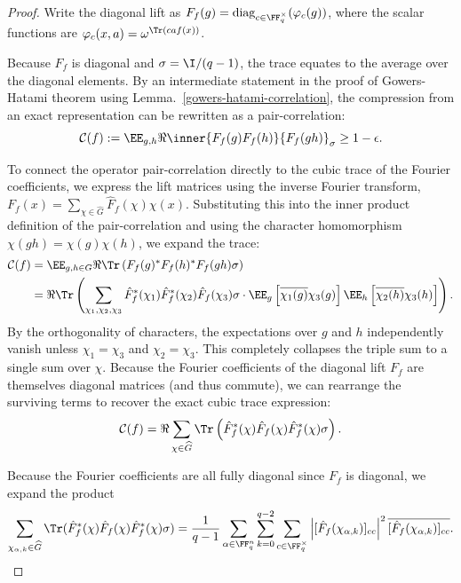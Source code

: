 \begin{proof}\leanok
Write the diagonal lift as $F_f(g) = \operatorname{diag}_{c \in \FF_q^\times}(\varphi_c(g))$, where the scalar functions are $\varphi_c(x,a) = \omega^{\Tr(caf(x))}$. 

Because $F_f$ is diagonal and $\sigma = \I/(q-1)$, the trace equates to the average over the diagonal elements. 
By an intermediate statement in the proof of Gowers-Hatami theorem using Lemma.~\ref{gowers-hatami-correlation}, the compression from an exact representation can be rewritten as a pair-correlation:
\begin{equation}
    \mathcal{C}(f) := \EE_{g,h} \Re \inner{F_f(g) F_f(h)}{F_f(gh)}_\sigma \ge 1 - \epsilon. \label{eq:gh-pair-correlation}
\end{equation}


To connect the operator pair-correlation directly to the cubic trace of the Fourier coefficients, we express the lift matrices using the inverse Fourier transform, $F_f(x) = \sum_{\chi \in \widehat{G}} \hat{F}_f(\chi) \chi(x)$. Substituting this into the inner product definition of the pair-correlation and using the character homomorphism $\chi(gh) = \chi(g)\chi(h)$, we expand the trace:
\begin{align}
    \mathcal{C}(f) &= \EE_{g,h \in G} \Re \Tr\left( F_f(g)^* F_f(h)^* F_f(gh) \sigma \right) \nonumber \\
    &= \Re \Tr \left( \sum_{\chi_1, \chi_2, \chi_3} \hat{F}_f^*(\chi_1) \hat{F}_f^*(\chi_2) \hat{F}_f(\chi_3) \sigma \cdot \EE_g\left[\overline{\chi_1(g)}\chi_3(g)\right] \EE_h\left[\overline{\chi_2(h)}\chi_3(h)\right] \right).
\end{align}
By the orthogonality of characters, the expectations over $g$ and $h$ independently vanish unless $\chi_1 = \chi_3$ and $\chi_2 = \chi_3$. This completely collapses the triple sum to a single sum over $\chi$. Because the Fourier coefficients of the diagonal lift $F_f$ are themselves diagonal matrices (and thus commute), we can rearrange the surviving terms to recover the exact cubic trace expression:
\begin{equation}
    \mathcal{C}(f) = \Re \sum_{\chi \in \widehat{G}} \Tr\left( \hat{F}_f^*(\chi) \hat{F}_f(\chi) \hat{F}_f^*(\chi) \sigma \right).
\end{equation}

    Because the Fourier coefficients are all fully diagonal since $F_f$ is diagonal, we expand the product
    \[
    \sum_{\chi_{\alpha, k} \in \widehat{G}} \Tr(\hat{F}_f^*(\chi)\hat{F}_f(\chi)\hat{F}_f^*(\chi) \sigma) = \frac{1}{q-1}\sum_{\alpha \in \FF_q^n} \sum_{k=0}^{q-2} \sum_{c \in \FF_q^\times} \left| [\hat{F}_f(\chi_{\alpha, k})]_{cc} \right|^2 \overline{[\hat{F}_f(\chi_{\alpha, k})]_{cc}}.
    \]


\end{proof}
